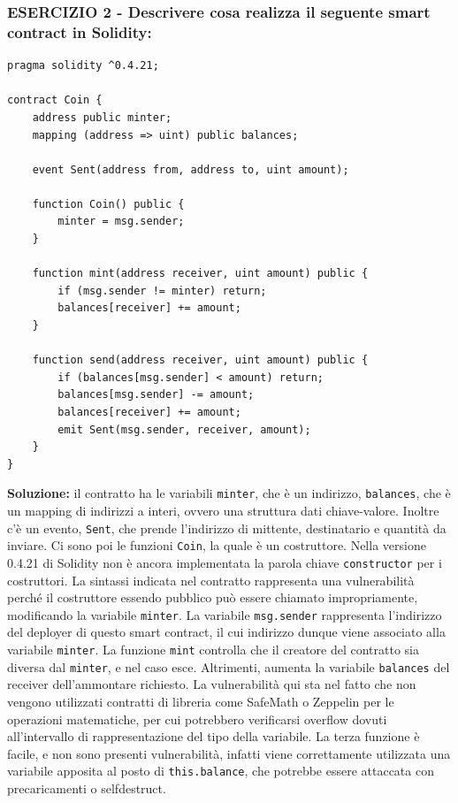 \subsubsection{ESERCIZIO 2 - Descrivere cosa realizza il seguente smart contract in Solidity:}
\begin{lstlisting}[language=Solidity]
pragma solidity ^0.4.21;

contract Coin {
    address public minter;
    mapping (address => uint) public balances;
    
    event Sent(address from, address to, uint amount);
    
    function Coin() public {
        minter = msg.sender;
    }
    
    function mint(address receiver, uint amount) public {
        if (msg.sender != minter) return;
        balances[receiver] += amount;
    }
    
    function send(address receiver, uint amount) public {
        if (balances[msg.sender] < amount) return;
        balances[msg.sender] -= amount;
        balances[receiver] += amount;
        emit Sent(msg.sender, receiver, amount);
    }
}
\end{lstlisting}
\textbf{Soluzione:} il contratto ha le variabili \texttt{minter}, che è un indirizzo, \texttt{balances}, che è un mapping di indirizzi a interi, ovvero una struttura dati chiave-valore. Inoltre c'è un evento, \texttt{Sent}, che prende l'indirizzo di mittente, destinatario e quantità da inviare. Ci sono poi le funzioni \texttt{Coin}, la quale è un costruttore. Nella versione 0.4.21 di Solidity non è ancora implementata la parola chiave \texttt{constructor} per i costruttori. La sintassi indicata nel contratto rappresenta una vulnerabilità perché il costruttore essendo pubblico può essere chiamato impropriamente, modificando la variabile \texttt{minter}. La variabile \texttt{msg.sender} rappresenta l'indirizzo del deployer di questo smart contract, il cui indirizzo dunque viene associato alla variabile \texttt{minter}. La funzione \texttt{mint} controlla che il creatore del contratto sia diversa dal \texttt{minter}, e nel caso esce. Altrimenti, aumenta la variabile \texttt{balances} del receiver dell'ammontare richiesto. La vulnerabilità qui sta nel fatto che non vengono utilizzati contratti di libreria come SafeMath o Zeppelin per le operazioni matematiche, per cui potrebbero verificarsi overflow dovuti all'intervallo di rappresentazione del tipo della variabile. La terza funzione è facile, e non sono presenti vulnerabilità, infatti viene correttamente utilizzata una variabile apposita al posto di \texttt{this.balance}, che potrebbe essere attaccata con precaricamenti o selfdestruct.


